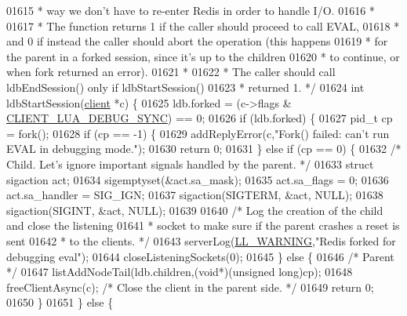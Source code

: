 \begin{DoxyCode}
{{{{{{{{{{{{{01615 \textcolor{comment}{ * way we don't have to re-enter Redis in order to handle I/O.}
01616 \textcolor{comment}{ *}
01617 \textcolor{comment}{ * The function returns 1 if the caller should proceed to call EVAL,}
01618 \textcolor{comment}{ * and 0 if instead the caller should abort the operation (this happens}
01619 \textcolor{comment}{ * for the parent in a forked session, since it's up to the children}
01620 \textcolor{comment}{ * to continue, or when fork returned an error).}
01621 \textcolor{comment}{ *}
01622 \textcolor{comment}{ * The caller should call ldbEndSession() only if ldbStartSession()}
01623 \textcolor{comment}{ * returned 1. */}
01624 \textcolor{keywordtype}{int} ldbStartSession(\hyperlink{structclient}{client} *c) \{
01625     ldb.forked = (c->flags & \hyperlink{server_8h_a2f388b8fa8e4b592be374850524472e5}{CLIENT\_LUA\_DEBUG\_SYNC}) == 0;
01626     \textcolor{keywordflow}{if} (ldb.forked) \{
01627         pid\_t cp = fork();
01628         \textcolor{keywordflow}{if} (cp == -1) \{
01629             addReplyError(c,\textcolor{stringliteral}{"Fork() failed: can't run EVAL in debugging mode."});
01630             \textcolor{keywordflow}{return} 0;
01631         \} \textcolor{keywordflow}{else} \textcolor{keywordflow}{if} (cp == 0) \{
01632             \textcolor{comment}{/* Child. Let's ignore important signals handled by the parent. */}
01633             \textcolor{keyword}{struct} sigaction act;
01634             sigemptyset(&act.sa\_mask);
01635             act.sa\_flags = 0;
01636             act.sa\_handler = SIG\_IGN;
01637             sigaction(SIGTERM, &act, NULL);
01638             sigaction(SIGINT, &act, NULL);
01639 
01640             \textcolor{comment}{/* Log the creation of the child and close the listening}
01641 \textcolor{comment}{             * socket to make sure if the parent crashes a reset is sent}
01642 \textcolor{comment}{             * to the clients. */}
01643             serverLog(\hyperlink{server_8h_a31229b9334bba7d6be2a72970967a14b}{LL\_WARNING},\textcolor{stringliteral}{"Redis forked for debugging eval"});
01644             closeListeningSockets(0);
01645         \} \textcolor{keywordflow}{else} \{
01646             \textcolor{comment}{/* Parent */}
01647             listAddNodeTail(ldb.children,(\textcolor{keywordtype}{void}*)(\textcolor{keywordtype}{unsigned} \textcolor{keywordtype}{long})cp);
01648             freeClientAsync(c); \textcolor{comment}{/* Close the client in the parent side. */}
01649             \textcolor{keywordflow}{return} 0;
01650         \}
01651     \} \textcolor{keywordflow}{else} \{
}}}}}}}}}}}}}
\end{DoxyCode}
